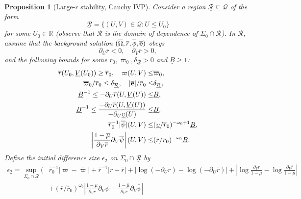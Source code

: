 \documentclass[10pt, reqno]{amsart}
\newtheorem{proposition}[theorem]{Proposition}
\theoremstyle{definition}
\theoremstyle{remark}
\theoremstyle{conjecture}
\numberwithin{equation}{section}
\newcommand{\abs}[1]{\vert#1\vert}
\newcommand{\set}[1]{\{#1\}}
\newcommand{\rd}{\partial}
\newcommand{\0}{\emptyset}
\newcommand{\dlt}{\delta}
\newcommand{\eps}{\epsilon}
\newcommand{\Sgm}{\Sigma}
\newcommand{\omg}{\omega}
\newcommand{\Omg}{\Omega}
\newcommand{\ups}{\upsilon}
\newcommand{\bfe}{{\bf e}}
\newcommand{\bbR}{\mathbb R}
\newcommand{\calQ}{\mathcal Q}
\newcommand{\calR}{\mathcal R}
\newcommand{\PD}{\calQ}
\newcommand{\e}{\bfe}							%
\newcommand{\Omgbg}{\overline{\Omg}}				%
\newcommand{\phibg}{\overline{\phi}}				%
\newcommand{\psibg}{\overline{\psi}}				%
\newcommand{\rbg}{\overline{r}}					%
\newcommand{\varpibg}{\overline{\varpi}}				%
\newcommand{\mubg}{\overline{\mu}}				%
\newcommand{\ebg}{\overline{\e}}					%
\newcommand{\Abs}[1]{\left\vert #1 \right\vert}
\begin{document}
\begin{proposition}[Large-$r$ stability, Cauchy IVP] \label{prop:extr-st-cauchy}
Consider a region $\underline{\calR} \subseteq \PD$ of the form
\begin{equation*}
\underline{\calR} = \set{(U, V) \in \PD : U \leq U_{0}}
\end{equation*}
for some $U_{0} \in \bbR$ (observe that $\underline{\calR}$ is the domain of dependence of $\Sgm_{0} \cap \underline{\calR}$). In $\underline{\calR}$, assume that the background solution $(\Omgbg, \rbg, \phibg, \ebg)$ obeys 
\begin{equation*}
	\rd_{U} \rbg < 0, \quad \rd_{V} \rbg > 0,
\end{equation*}
and the following bounds for some $\rbg_{0}, \varpibg_{0}, \dlt_{\underline{\calR}} >0$ and $\underline{B} \geq 1$: 
\begin{align}
	\rbg(U_{0}, \underline{V}(U_{0})) \geq \rbg_{0}, \quad
	\varpi (U,V) \leq & \varpibg_{0}, \label{eq:extr-st-cauchy:hyp:r-m} \\
	\varpibg_{0} / \rbg_{0} \leq \dlt_{\underline{\calR}}, \quad
	\abs{\ebg} / \rbg_{0} \leq & \dlt_{\underline{\calR}}, \label{eq:extr-st-cauchy:hyp:m-e}\\
	\underline{B}^{-1} \leq -\rd_{U} \rbg(U, \underline{V}(U)) \leq & \underline{B}, \label{eq:extr-st-cauchy:hyp:dur} \\
	\underline{B}^{-1} \leq \frac{-\rd_{U} \rbg(U, \underline{V}(U))}{- \rd_{U} \underline{\ups}(U)} \leq & \underline{B}, \label{eq:extr-st-cauchy:hyp:duups}\\
	\rbg_{0}^{-1} \abs{\psibg} (U,V) \leq & (\underline{\ups} / \rbg_{0})^{- \omg_0 +1}  \underline{B}, \label{eq:extr-st-cauchy:hyp:psi}\\
	\Abs{\frac{1-\mubg}{\rd_{V} \rbg} \rd_{V} \psibg}(U,V) \leq & (\rbg / \rbg_{0})^{-\omg_0} \underline{B}. \label{eq:extr-st-cauchy:hyp:dvpsi}
\end{align}
Define the initial difference size $\eps_{2}$ on $\Sgm_{0} \cap \underline{\calR}$ by
\begin{align*}
	\eps_{2} 
= \sup_{\Sgm_{0} \cap \underline{\calR}} \bigg( &
	\rbg_{0}^{-1} \abs{\varpi - \varpibg}
	+ \rbg^{-1} \abs{r - \rbg}
	+ \Abs{\log (-\rd_{U} r) - \log (-\rd_{U} \rbg)}
	+ \Abs{\log \frac{\rd_{V} r}{1-\mu} - \log \frac{\rd_{V} \rbg}{1-\mubg}} \\
	& + (\rbg / \rbg_{0})^{\omg_0} \Abs{\frac{1-\mu}{\rd_{V} r}\rd_{V} \psi - \frac{1-\mubg}{\rd_{V} \rbg} \rd_{V} \psibg} 

\end{align*}
\end{proposition}
\end{document}
